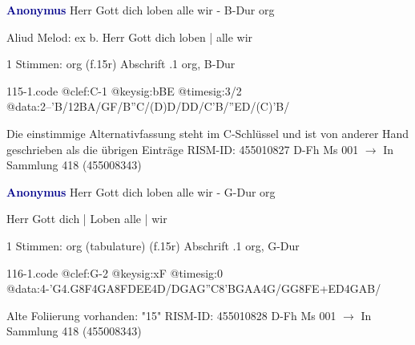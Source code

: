 \documentclass[twocolumn]{book}
\begin{document}
\newline \par \vspace{7pt} \textcolor{darkblue}{\textbf{Anonymus  }}
\newline Herr Gott dich loben alle wir - B-Dur
\newline org
\newline \begin{itshape} Aliud Melod: ex b. Herr Gott dich loben | alle wir\end{itshape} 
\newline \textcolor{darkblue}{}  1 Stimmen: org  (f.15r)
\newline Abschrift
.1  org, B-Dur  
\begin{filecontents*}{115-1.code}
@clef:C-1
@keysig:bBE
@timesig:3/2
@data:2--'B/12BA/GF/B''C/(D)D/DD/C'B/''ED/(C)'B/
\end{filecontents*}
\newline
%
\newline Die einstimmige Alternativfassung steht im C-Schlüssel und ist von anderer Hand geschrieben als die übrigen Einträge
\newline RISM-ID: 455010827
\newline D-Fh  Ms 001
\newline $\rightarrow$ In Sammlung 418 (455008343)
      
\newline \par \vspace{7pt} \textcolor{darkblue}{\textbf{Anonymus  }}
\newline Herr Gott dich loben alle wir - G-Dur
\newline org
\newline \begin{itshape}[f.15r, at left:] Herr Gott dich | Loben alle | wir\end{itshape} 
\newline \textcolor{darkblue}{}  1 Stimmen: org (tabulature)  (f.15r)
\newline Abschrift
.1  org, G-Dur  
\begin{filecontents*}{116-1.code}
@clef:G-2
@keysig:xF
@timesig:0
@data:4-'G4.G8F4GA{8FDEE}4D/DGAG''C{8'BGAA}4G/GG{8FE+}{ED}4GAB/
\end{filecontents*}
\newline
%
\newline Alte Foliierung vorhanden: "15"
\newline RISM-ID: 455010828
\newline D-Fh  Ms 001
\newline $\rightarrow$ In Sammlung 418 (455008343)
      
\end{document}
